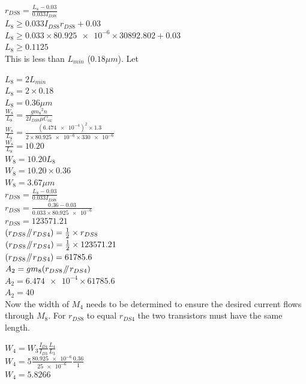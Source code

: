 $r_{DS8} = \frac{L_{8} - 0.03}{0.033I_{DS8}}$ \\
$L_{8} \ge 0.033I_{DS8}r_{DS8} + 0.03$ \\
$L_{8} \ge 0.033 \times \num{80.925e-6} \times 30892.802 + 0.03$ \\
$L_{8} \ge 0.1125$ \\

This is less than $L_{min}$ ($0.18\mu m$).
Let

$L_{8} = 2L_{min}$ 	\\
$L_{8} = 2 \times 0.18$ \\
$L_{8} = 0.36\mu m$ \\

$\frac{W_{8}}{L_{8}} = \frac{{gm_{8}}^{2}n}{2I_{DS8}\mu C_{ox}}$ \\
$\frac{W_{8}}{L_{8}} = \frac{(\num{6.474e-4})^{2} \times 1.3}{2 \times \num{80.925e-6} \times \num{330e-6}}$ \\
$\frac{W_{8}}{L_{8}} = 10.20$ \\

$W_{8} = 10.20L_{8}$ \\
$W_{8} = 10.20 \times 0.36$ \\
$W_{8} = 3.67\mu m$ \\

$r_{DS8} = \frac{L_{8} - 0.03}{0.033I_{DS8}}$ \\
$r_{DS8} = \frac{0.36 - 0.03}{0.033 \times \num{80.925e-6}}$ \\
$r_{DS8} = 123571.21$ \\

$(r_{DS8} \mathbin{\!/\mkern-5mu/\!} r_{DS4}) = \frac{1}{2} \times r_{DS8}$ \\
$(r_{DS8} \mathbin{\!/\mkern-5mu/\!} r_{DS4}) = \frac{1}{2} \times 123571.21$ \\
$(r_{DS8} \mathbin{\!/\mkern-5mu/\!} r_{DS4}) = 61785.6$ \\

$A_{2} = gm_{8}(r_{DS8} \mathbin{\!/\mkern-5mu/\!} r_{DS4})$ \\
$A_{2} = \num{6.474e-4} \times 61785.6$ \\
$A_{2} = 40$ \\

Now the width of $M_{4}$ needs to be determined to ensure the desired current flows through $M_{8}$.
For $r_{DS8}$ to equal $r_{DS4}$ the two transistors must have the same length.

$W_{4} = W_{3}\frac{I_{D4}}{I_{D3}}\frac{L_{4}}{L_{3}}$ \\
$W_{4} = 5\frac{\num{80.925e-6}}{\num{25e-6}}\frac{0.36}{1}$ \\
$W_{4} = 5.8266$ \\

